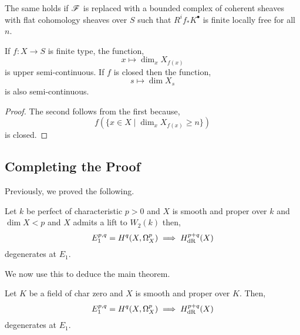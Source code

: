 \documentclass[12pt]{article}
\begin{document}
\begin{rmk}
The same holds if $\mathscr{F}$ is replaced with a bounded complex of coherent sheaves with flat cohomology sheaves over $S$ such that $R^i f_* K^\bullet$ is finite locally free for all $n$.
\end{rmk}

\begin{thm}
If $f : X \to S$ is finite type, the function,
\[ x \mapsto \dim_x X_{f(x)} \]
is upper semi-continuous. If $f $ is closed then the function,
\[ s \mapsto \dim X_s \]
is also semi-continuous. 
\end{thm}

\begin{proof}
The second follows from the first because,
\[ f(\{ x \in X \mid \dim_x X_{f(x)} \ge n \}) \]
is closed. 
\end{proof}

\subsection{Completing the Proof}

\begin{rmk}
Previously, we proved the following.
\end{rmk}

\begin{thm}
Let $k$ be perfect of characteristic $p > 0$ and $X$ is smooth and proper over $k$ and $\dim{X} < p$ and $X$ admits a lift to $W_2(k)$ then,
\[ E^{p,q}_1 = H^q(X, \Omega^p_X) \implies H_{\mathrm{dR}}^{p+q}(X) \]
degenerates at $E_1$.
\end{thm}

\begin{rmk}
We now use this to deduce the main theorem.
\end{rmk}

\begin{thm}
Let $K$ be a field of char zero and $X$ is smooth and proper over $K$. Then,
\[ E_1^{p,q} = H^q(X, \Omega^p_X) \implies H^{p+q}_{\mathrm{dR}}(X) \]
degenerates at $E_1$.
\end{thm}

\renewcommand{\X}{\mathfrak{X}}
\end{document}
